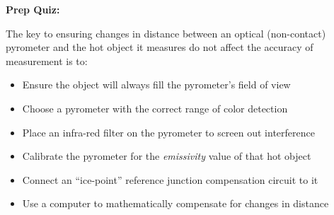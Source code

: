 \vfil \eject

\noindent
{\bf Prep Quiz:}

The key to ensuring changes in distance between an optical (non-contact) pyrometer and the hot object it measures do not affect the accuracy of measurement is to:

\begin{itemize}
\item{} Ensure the object will always fill the pyrometer's field of view
\vskip 5pt 
\item{} Choose a pyrometer with the correct range of color detection 
\vskip 5pt 
\item{} Place an infra-red filter on the pyrometer to screen out interference
\vskip 5pt 
\item{} Calibrate the pyrometer for the {\it emissivity} value of that hot object
\vskip 5pt 
\item{} Connect an ``ice-point'' reference junction compensation circuit to it
\vskip 5pt 
\item{} Use a computer to mathematically compensate for changes in distance
\end{itemize}





